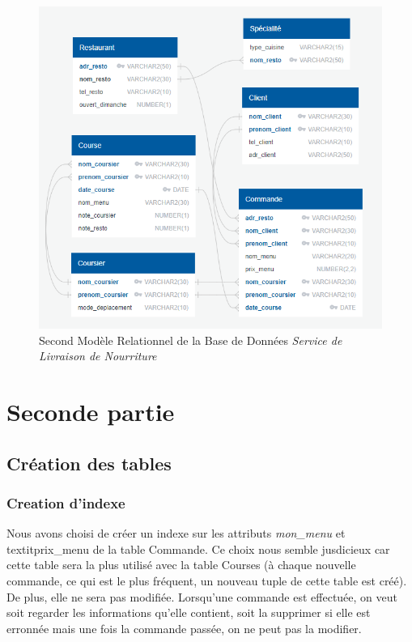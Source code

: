 \documentclass[french]{article}
\begin{document}
        \begin{figure}[ht] %
            \centering
            \includegraphics[scale = 0.7]{Image/modele_relationnel_2.png}
            \caption{Second Modèle Relationnel de la Base de Données \emph{Service de Livraison de Nourriture}}
            \label{image_modele_relationnel_2}
        \end{figure}
        \newpage

\section{Seconde partie}
        \subsection*{Création des tables}


        \subsubsection*{Creation d'indexe}
        Nous avons choisi de créer un indexe sur les attributs \textit{mon\_menu} et textit{prix\_menu} de la table Commande. Ce choix nous semble jusdicieux car cette table sera la plus utilisé avec la table Courses (à chaque nouvelle commande, ce qui est le plus fréquent, un nouveau tuple de cette table est créé). De plus, elle ne sera pas modifiée. Lorsqu'une commande est effectuée, on veut soit regarder les informations qu'elle contient, soit la supprimer si elle est erronnée mais une fois la commande passée, on ne peut pas la modifier. 
            
\end{document}
